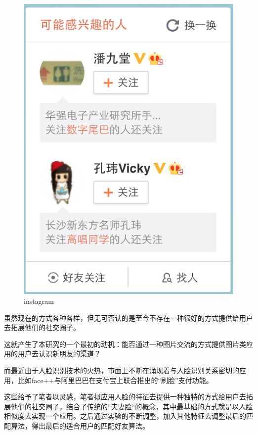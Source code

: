 \begin{figure}[h]
\begin{minipage}[t]{0.45\linewidth}
\includegraphics[width=\textwidth]{img/chap1/weibo_recommend.png}
\caption{instagram\label{weibo推荐}}
\end{minipage}

\end{figure}
虽然现在的方式各种各样，但无可否认的是至今不存在一种很好的方式提供给用户去拓展他们的社交圈子。

这就产生了本研究的一个最初的动机：能否通过一种图片交流的方式提供图片类应用的用户去认识新朋友的渠道？

而最近由于人脸识别技术的火热，市面上不断在涌现着与人脸识别关系密切的应用，比如face++与阿里巴巴在支付宝上联合推出的“刷脸”支付功能。

这些给予了笔者以灵感，笔者拟应用人脸的特征去提供一种独特的方式给用户去拓展他们的社交圈子，结合了传统的“夫妻脸“的概念，其中最基础的方式就是以人脸相似度去实现一个应用。之后通过实验的不断调整，加入其他特征去调整最后的匹配算法，得出最后的适合用户的匹配好友算法。
